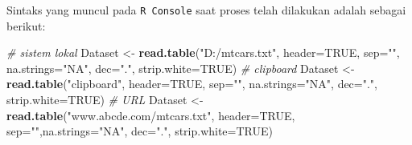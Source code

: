 \documentclass[12pt,]{krantz}
\newenvironment{Shaded}{\begin{snugshade}}{\end{snugshade}}
\newcommand{\CommentTok}[1]{\textcolor[rgb]{0.56,0.35,0.01}{\textit{#1}}}
\newcommand{\DataTypeTok}[1]{\textcolor[rgb]{0.13,0.29,0.53}{#1}}
\newcommand{\KeywordTok}[1]{\textcolor[rgb]{0.13,0.29,0.53}{\textbf{#1}}}
\newcommand{\NormalTok}[1]{#1}
\newcommand{\OtherTok}[1]{\textcolor[rgb]{0.56,0.35,0.01}{#1}}
\newcommand{\StringTok}[1]{\textcolor[rgb]{0.31,0.60,0.02}{#1}}
\begin{document}
Sintaks yang muncul pada \texttt{R\ Console} saat proses telah dilakukan adalah sebagai berikut:

\begin{Shaded}
\begin{Highlighting}[]
\CommentTok{# sistem lokal}
\NormalTok{Dataset <-}\StringTok{ }\KeywordTok{read.table}\NormalTok{(}\StringTok{"D:/mtcars.txt"}\NormalTok{, }\DataTypeTok{header=}\OtherTok{TRUE}\NormalTok{, }
                      \DataTypeTok{sep=}\StringTok{""}\NormalTok{, }\DataTypeTok{na.strings=}\StringTok{"NA"}\NormalTok{, }\DataTypeTok{dec=}\StringTok{"."}\NormalTok{,}
                      \DataTypeTok{strip.white=}\OtherTok{TRUE}\NormalTok{)}
\CommentTok{# clipboard}
\NormalTok{Dataset <-}\StringTok{ }\KeywordTok{read.table}\NormalTok{(}\StringTok{"clipboard"}\NormalTok{, }\DataTypeTok{header=}\OtherTok{TRUE}\NormalTok{, }
                      \DataTypeTok{sep=}\StringTok{""}\NormalTok{, }\DataTypeTok{na.strings=}\StringTok{"NA"}\NormalTok{,}
                      \DataTypeTok{dec=}\StringTok{"."}\NormalTok{, }\DataTypeTok{strip.white=}\OtherTok{TRUE}\NormalTok{)}
\CommentTok{# URL}
\NormalTok{Dataset <-}\StringTok{ }\KeywordTok{read.table}\NormalTok{(}\StringTok{"www.abcde.com/mtcars.txt"}\NormalTok{, }
                      \DataTypeTok{header=}\OtherTok{TRUE}\NormalTok{, }\DataTypeTok{sep=}\StringTok{""}\NormalTok{,}\DataTypeTok{na.strings=}\StringTok{"NA"}\NormalTok{, }
                      \DataTypeTok{dec=}\StringTok{"."}\NormalTok{, }\DataTypeTok{strip.white=}\OtherTok{TRUE}\NormalTok{)}
\end{Highlighting}
\end{Shaded}
\end{document}
